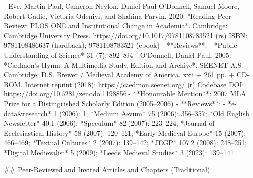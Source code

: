 - Eve, Martin Paul, Cameron Neylon, Daniel Paul O’Donnell, Samuel Moore\*, Robert Gadie\*, Victoria Odeniyi\*, and Shahina Parvin\*. 2020. *Reading Peer Review: PLOS ONE and Institutional Change in Academia*. Cambridge: Cambridge University Press. https:/\allowbreak{}/\allowbreak{}doi.org/\allowbreak{}10.1017/\allowbreak{}9781108783521 (rs)
  ISBN: 9781108486637 (hardback); 9781108783521 (ebook)
  - **Reviews**:
    - *Public Understanding of Science* 31 (7): 892–894
- O’Donnell, Daniel Paul. 2005. *Cædmon’s Hymn: A Multimedia Study, Edition and Archive*. SEENET A.8. Cambridge: D.S. Brewer /\allowbreak{} Medieval Academy of America. xxii + 261 pp. + CD-ROM.
  Internet reprint (2018): https:/\allowbreak{}/\allowbreak{}caedmon.seenet.org/\allowbreak{} (r)
  Codebase DOI: https:/\allowbreak{}/\allowbreak{}doi.org/\allowbreak{}10.5281/\allowbreak{}zenodo.1198856
  - **Honourable Mention**: 2007 MLA Prize for a Distinguished Scholarly Edition (2005–2006)
  - **Reviews**:
    - *e-data&research* 1 (2006): 1; *Medium Aevum* 75 (2006): 356–357; *Old English Newsletter* 40.1 (2006); *Speculum* 82 (2007): 223–224; *Journal of Ecclesiastical History* 58 (2007): 120–121; *Early Medieval Europe* 15 (2007): 466–469; *Textual Cultures* 2 (2007): 139–142; *JEGP* 107.2 (2008): 248–251; *Digital Medievalist* 5 (2009); *Leeds Medieval Studies* 3 (2023): 139–141

\sectionbreak{}
## Peer-Reviewed and Invited Articles and Chapters (Traditional)

